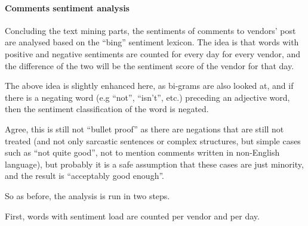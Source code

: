\documentclass[]{article}
\newenvironment{Shaded}{\begin{snugshade}}{\end{snugshade}}
\newcommand{\KeywordTok}[1]{\textcolor[rgb]{0.13,0.29,0.53}{\textbf{{#1}}}}
\newcommand{\DataTypeTok}[1]{\textcolor[rgb]{0.13,0.29,0.53}{{#1}}}
\newcommand{\DecValTok}[1]{\textcolor[rgb]{0.00,0.00,0.81}{{#1}}}
\newcommand{\StringTok}[1]{\textcolor[rgb]{0.31,0.60,0.02}{{#1}}}
\newcommand{\CommentTok}[1]{\textcolor[rgb]{0.56,0.35,0.01}{\textit{{#1}}}}
\newcommand{\NormalTok}[1]{{#1}}
\let\oldparagraph\paragraph
\renewcommand{\paragraph}[1]{\oldparagraph{#1}\mbox{}}
\begin{document}
\paragraph{Comments sentiment
analysis}\label{comments-sentiment-analysis}

Concluding the text mining parts, the sentiments of comments to vendors'
post are analysed based on the ``bing'' sentiment lexicon. The idea is
that words with positive and negative sentiments are counted for every
day for every vendor, and the difference of the two will be the
sentiment score of the vendor for that day.

The above idea is slightly enhanced here, as bi-grams are also looked
at, and if there is a negating word (e.g ``not'', ``isn't'', etc.)
preceding an adjective word, then the sentiment classification of the
word is negated.

Agree, this is still not ``bullet proof'' as there are negations that
are still not treated (and not only sarcastic sentences or complex
structures, but simple cases such as ``not quite good'', not to mention
comments written in non-English language), but probably it is a safe
assumption that these cases are just minority, and the result is
``acceptably good enough''.

So as before, the analysis is run in two steps.

First, words with sentiment load are counted per vendor and per day.

\begin{Shaded}
\end{Shaded}
\end{document}

